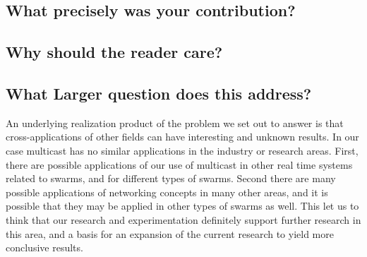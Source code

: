 \documentclass[journal]{IEEEtran}
\begin{document}
\subsection{What precisely was your contribution?}
\subsection{Why should the reader care?}
\subsection{What Larger question does this address?}
An underlying realization product of the problem we set out to answer is that cross-applications of other fields can have interesting and unknown results. In our case multicast has no similar applications in the industry or research areas. First, there are possible applications of our use of multicast in other real time systems related to swarms, and for different types of swarms. Second there are many possible applications of networking concepts in many other areas, and it is possible that they may be applied in other types of swarms as well. 
This let us to think that our research and experimentation definitely support further research in this area, and a basis for an expansion of the current research to yield more conclusive results. 
\end{document}
